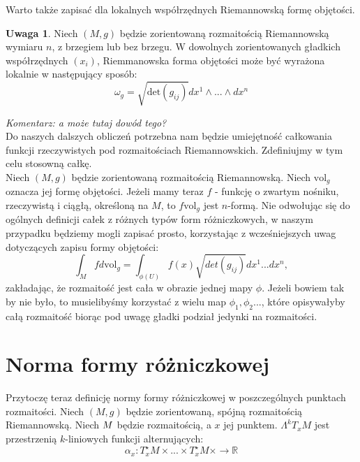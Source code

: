 \documentclass[licencjacka]{pracamgr}
\theoremstyle{definition}
\theoremstyle{definition}
\newtheorem{remark}{Uwaga}[section]
\theoremstyle{plain}
\theoremstyle{plain}
\theoremstyle{plain}
\theoremstyle{plain}
\def\M{\ensuremath M}
\begin{document}
Warto także zapisać dla lokalnych współrzędnych Riemannowską formę objętości. 
\begin{remark} %
Niech $(M, g)$ będzie zorientowaną rozmaitością Riemannowską wymiaru $n$, z
brzegiem lub bez brzegu. W dowolnych zorientowanych gładkich współrzędnych
$(x_i)$, Riemmanowska forma objętości może być wyrażona lokalnie w następujący
sposób:
\[
    \omega_g = \sqrt{\text{det}(g_{ij})} dx^1 \wedge ... \wedge dx^n
\]
\end{remark}
\emph{Komentarz: a może tutaj dowód tego? }\\

Do naszych dalszych obliczeń potrzebna nam będzie umiejętność całkowania
funkcji rzeczywistych pod rozmaitościach Riemannowskich. Zdefiniujmy w tym celu
stosowną całkę. \\

Niech $(M, g)$ będzie zorientowaną rozmaitością Riemannowską. Niech
$\text{vol}_g$ oznacza jej formę objętości. Jeżeli mamy teraz $f$ -
funkcję o zwartym nośniku, rzeczywistą i ciągłą, określoną na $M$, to
$f \text{vol}_g$ jest $n$-formą.
Nie odwołując się do ogólnych definicji całek z różnych typów form
różniczkowych, w naszym przypadku będziemy mogli zapisać prosto, korzystając z
wcześniejszych uwag dotyczących zapisu formy objętości:
\[ %
  \int_M f d \text{vol}_g = \int_{\phi (U)} f(x) \sqrt{det(g_{ij})} dx^1 ... dx^n,
\]
zakładając, że rozmaitość jest cała w obrazie jednej mapy
$\phi$. Jeżeli bowiem tak by nie było, to musielibyśmy korzystać z
wielu map $\phi_1, \phi_2 ... $, które opisywałyby całą rozmaitość
biorąc pod uwagę gładki podział jedynki na rozmaitości. \\



\section{Norma formy różniczkowej}

Przytoczę teraz definicję normy formy różniczkowej w poszczególnych punktach
rozmaitości. Niech $(M, g)$ będzie zorientowaną, spójną %
rozmaitością Riemannowską. Niech $\M$ będzie rozmaitością, a $x$ jej punktem.
$\Lambda^k T_x M$ jest przestrzenią $k$-liniowych funkcji alternujących:
\[
    \alpha_x:T_x^\star M \times ... \times T_x^\star M \times \rightarrow \mathbb{R}
\] \\
\end{document}

